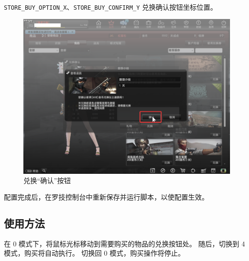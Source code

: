 \lstinline{STORE_BUY_OPTION_X}、\lstinline{STORE_BUY_CONFIRM_Y} 兑换确认按钮坐标位置。

\begin{figure}[H]
    \Centering
    \includegraphics[width=\textwidth]{docs/assets/store_buy_confirm.png}
    \caption{兑换“确认”按钮}
\end{figure}

配置完成后，在罗技控制台中重新保存并运行脚本，以使配置生效。

\subsection{使用方法}

在 0 模式下，将鼠标光标移动到需要购买的物品的兑换按钮处。
随后，切换到 4 模式，购买将自动执行。
切换回 0 模式，购买操作将停止。